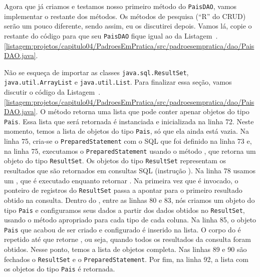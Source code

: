 Agora que já criamos e testamos nosso primeiro método do \texttt{PaisDAO}, vamos implementar o restante dos métodos. Os métodos de pesquisa (``R'' do CRUD) serão um pouco diferente, sendo assim, eu os discutirei depois. Vamos lá, copie o restante do código para que seu \texttt{PaisDAO} fique igual ao da Listagem~\thechapter.\ref{listagem:projetos/capitulo04/PadroesEmPratica/src/padroesempratica/dao/PaisDAO.java}.


Não se esqueça de importar as classes \texttt{java.sql.ResultSet}, \texttt{java.util.ArrayList} e \texttt{java.util.List}. Para finalizar essa seção, vamos discutir o código da Listagem~\thechapter.\ref{listagem:projetos/capitulo04/PadroesEmPratica/src/padroesempratica/dao/PaisDAO.java}. O método  retorna uma lista que pode conter apenar objetos do tipo \texttt{Pais}. Essa lista que será retornada é instanciada e inicializada na linha 72. Neste momento, temos a lista de objetos do tipo \texttt{Pais}, só que ela ainda está vazia. Na linha 75, cria-se o \texttt{PreparedStatement} com o SQL que foi definido na linha 73 e, na linha 75, executamos o \texttt{PreparedStatement} usando o método , que retorna um objeto do tipo \texttt{ResultSet}. Os objetos do tipo \texttt{ResultSet} representam os resultados que são retornados em consultas SQL (instrução ). Na linha 78 usamos um , que é executado enquanto  retornar . Na primeira vez que  é invocado, o ponteiro de registros do \texttt{ResultSet} passa a apontar para o primeiro resultado obtido na consulta. Dentro do , entre as linhas 80 e 83, nós criamos um objeto do tipo \texttt{Pais} e configuramos seus dados a partir dos dados obtidos no \texttt{ResultSet}, usando o método apropriado para cada tipo de cada coluna. Na linha 85, o objeto \texttt{Pais} que acabou de ser criado e configurado é inserido na lista. O corpo do  é repetido até que  retorne , ou seja, quando todos os resultados da consulta foram obtidos. Nesse ponto, temos a lista de objetos completa. Nas linhas 89 e 90 são fechados o \texttt{ResultSet} e o \texttt{PreparedStatement}. Por fim, na linha 92, a lista com os objetos do tipo \texttt{Pais} é retornada.

